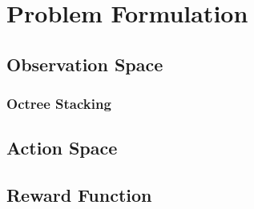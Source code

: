 \chapter{Problem Formulation}\label{ch:problem_formulation}





\section{Observation Space}

\subsection{Octree Stacking}



\section{Action Space}









\section{Reward Function}


